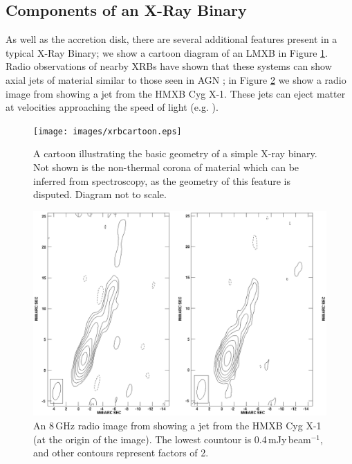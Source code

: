 \subsection{Components of an X-Ray Binary}

\par As well as the accretion disk, there are several additional features present in a typical X-Ray Binary; we show a cartoon diagram of an LMXB in Figure \ref{fig:xrbcartoon}.   Radio observations of nearby XRBs have shown that these systems can show axial jets of material similar to those seen in AGN \citep{Geldzahler_Jet}; in Figure \ref{fig:jet} we show a radio image from \citet{Stirling_Jet} showing a jet from the HMXB Cyg X-1. These jets can eject matter at velocities approaching the speed of light (e.g. \citealp{Mirabel_Microquasar}).

\begin{figure}
    \texttt{[image: images/xrbcartoon.eps]}
    \captionsetup{singlelinecheck=off}
    \caption[A cartoon illustrating the basic geometry of a simple X-ray binary.]{A cartoon illustrating the basic geometry of a simple X-ray binary.  Not shown is the non-thermal corona of material which can be inferred from spectroscopy, as the geometry of this feature is disputed.  Diagram not to scale.}
   \label{fig:xrbcartoon}
\end{figure}

\begin{figure}
   \centering
    \includegraphics[width=0.5\columnwidth, trim = 17mm 0mm 17mm 0mm, clip]{images/jet.eps}
    \captionsetup{singlelinecheck=off}
    \caption[An 8\,GHz radio image from \citet{Stirling_Jet} showing a jet from the HMXB Cyg X-1.]{An 8\,GHz radio image from \citet{Stirling_Jet} showing a jet from the HMXB Cyg X-1 (at the origin of the image).  The lowest countour is 0.4\,mJy\,beam$^{-1}$, and other contours represent factors of 2.}
   \label{fig:jet}
\end{figure}

